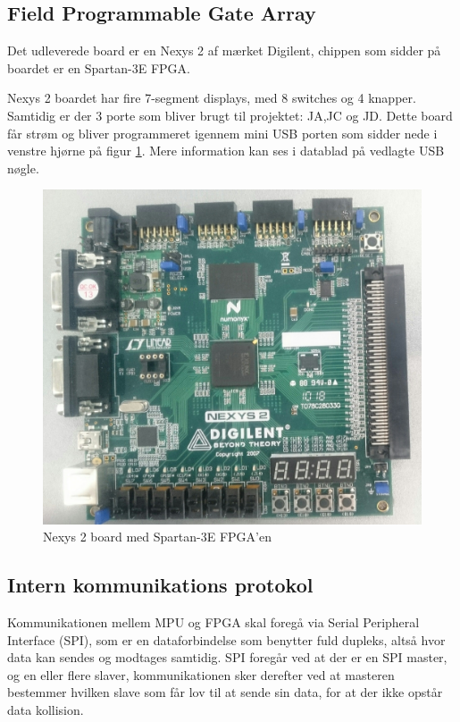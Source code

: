 \subsection{Field Programmable Gate Array}

Det udleverede board er en Nexys 2 af mærket Digilent, chippen som sidder på boardet er en Spartan-3E FPGA.

Nexys 2 boardet har fire 7-segment displays, med 8 switches og 4 knapper. Samtidig er der 3 porte som bliver brugt til projektet: JA,JC og JD.
Dette board får strøm og bliver programmeret igennem mini USB porten som sidder nede i venstre hjørne på figur \ref{fig:Nexys2Board}.
Mere information kan ses i datablad \cite{Nexys2Datasheet} på vedlagte USB nøgle.

\begin{figure}[!ht]
	\begin{center}
		\includegraphics[scale=0.08, angle =0]{Billeder/Nexys2Board.JPG}
	\end{center}
\caption{Nexys 2 board med Spartan-3E FPGA'en}
\label{fig:Nexys2Board}
\end{figure}

\subsection{Intern kommunikations protokol}
Kommunikationen mellem MPU og FPGA skal foregå via Serial Peripheral Interface (SPI), som er en dataforbindelse som benytter fuld dupleks, altså hvor data kan sendes og modtages samtidig.
SPI foregår ved at der er en SPI master, og en eller flere slaver, kommunikationen sker derefter ved at masteren bestemmer hvilken slave som får lov til at sende sin data, for at der ikke opstår data kollision.

